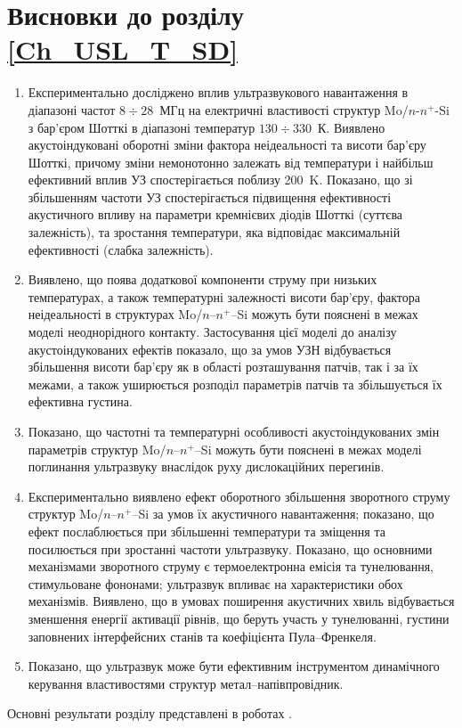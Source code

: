 \section*{Висновки до розділу \ref{Ch_USL_T_SD}}
  \begin{enumerate}[leftmargin=0cm,itemindent=3em]
     \item Експериментально досліджено вплив ультразвукового навантаження в діапазоні частот $8\div28$~МГц на електричні властивості структур Mo/$n$-$n^{+}$-Si з бар'єром Шотткі в діапазоні температур $130\div330$~К.
 Виявлено акустоіндуковані оборотні зміни фактора неідеальності та висоти бар'єру Шотткі, причому зміни немонотонно залежать від температури і найбільш ефективний вплив УЗ спостерігається поблизу 200~K.
  Показано, що зі збільшенням частоти УЗ  спостерігається підвищення ефективності акустичного впливу на параметри кремнієвих діодів Шотткі (суттєва залежність),
та зростання температури, яка відповідає максимальній ефективності (слабка залежність).



\item Виявлено, що поява додаткової компоненти струму при низьких температурах, а також температурні залежності висоти бар'єру, фактора неідеальності в структурах Mo/$n$--$n^{+}$--Si можуть бути пояснені в межах моделі неоднорідного контакту.
    Застосування цієї моделі до аналізу акустоіндукованих ефектів показало, що
 за умов УЗН відбувається збільшення висоти бар'єру як в області розташування патчів, так і за їх межами, а також уширюється розподіл параметрів патчів та збільшується їх ефективна густина.


\item Показано, що частотні та температурні особливості акустоіндукованих змін параметрів структур Mo/$n$--$n^{+}$--Si можуть бути пояснені в межах
 моделі поглинання ультразвуку внаслідок руху дислокаційних перегинів.



\item Експериментально виявлено ефект оборотного збільшення зворотного струму структур Mo/$n$--$n^{+}$--Si за умов їх акустичного навантаження;
показано, що ефект послаблюється при збільшенні температури та зміщення та посилюється при зростанні частоти ультразвуку.
Показано, що основними механізмами зворотного струму є термоелектронна емісія та тунелювання, стимульоване фононами;
ультразвук впливає на характеристики обох механізмів.
 Виявлено, що в умовах поширення акустичних хвиль відбувається зменшення енергії активації рівнів, що беруть участь у тунелюванні,
густини заповнених інтерфейсних станів та коефіцієнта Пула--Френкеля.

\item Показано, що ультразвук може бути ефективним інструментом динамічного керування властивостями структур метал--напівпровідник.

  \end{enumerate}	

Основні результати розділу представлені в роботах \cite{Olikh:UPJ2014,OlikhJAP,Olikh:Ultras2016,Olikh2016JSem,
8Drog,2014IUSOl,2015ICU,7UNCPS}.
